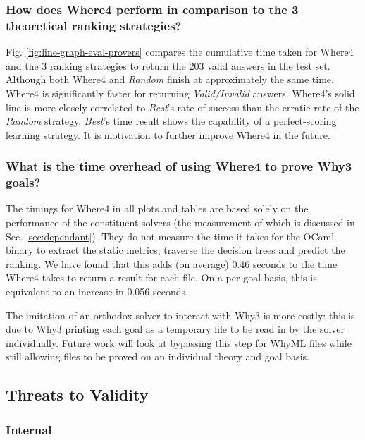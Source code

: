 \documentclass[submission,copyright,creativecommons]{eptcs}
\begin{document}
\subsubsection*{How does \textsf{Where4} perform in comparison to the 3 theoretical ranking strategies?}
Fig. \ref{fig:line-graph-eval-provers} compares the cumulative time taken for \textsf{Where4} and the 3 ranking strategies to return the 203 valid answers in the test set. Although both \textsf{Where4} and \textit{Random} finish at approximately the same time, \textsf{Where4} is significantly faster for returning \textit{Valid/Invalid} answers. \textsf{Where4}'s solid line is more closely correlated to \textit{Best}'s rate of success than the erratic rate of the \textit{Random} strategy. \textit{Best}'s time result shows the capability of a perfect-scoring learning strategy. It is motivation to further improve \textsf{Where4} in the future.   

\subsubsection*{What is the time overhead of using \textsf{Where4} to prove \textsf{Why3} goals?}The timings for \textsf{Where4} in all plots and tables are based solely on the performance of the constituent solvers (the measurement of which is discussed in Sec. \ref{sec:dependant}). They do not measure the time it takes for the OCaml binary to extract the static metrics, traverse the decision trees and predict the ranking. We have found that this adds (on average) 0.46 seconds to the time \textsf{Where4} takes to return a result for each file. On a per goal basis, this is equivalent to an increase in 0.056 seconds. 

The imitation of an orthodox solver to interact with \textsf{Why3} is more costly: this is due to \textsf{Why3} printing each goal as a temporary file to be read in by the solver individually. Future work will look at bypassing this step for WhyML files while still allowing files to be proved on an individual theory and goal basis.    

\subsection{Threats to Validity}

\subsubsection{Internal}
\label{sec:internal}
\end{document}
